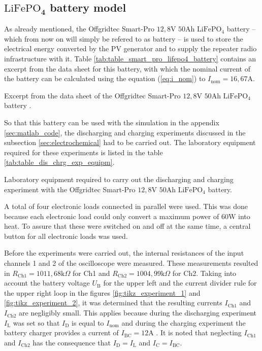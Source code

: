 \clearpage
\subsection{$\boldsymbol{\mathrm{LiFePO}_4}$ battery model} \label{sec_bat_res}
As already mentioned, the Offgridtec Smart-Pro $12,8\mathrm{V}$ $50\mathrm{Ah}$ $\mathrm{LiFePO_4}$ battery -- which from now on will simply be refered to as battery -- is used to store the electrical energy converted by the PV generator and to supply the repeater radio infrastructure with it. Table \ref{tab:table_smart_pro_lifepo4_battery} contains an excerpt from the data sheet for this battery, with which the nominal current of the battery can be calculated using the equation (\ref{eq:i_nom}) to $I_\mathrm{nom} = 16,67\mathrm{A}$. 
\begin{table}[h!]
	\centering
	
	\caption{Excerpt from the data sheet of the Offgridtec Smart-Pro $12,8\mathrm{V}$ $50\mathrm{Ah}$ $\mathrm{LiFePO_4}$ battery \cite{Offgridtec:2020}.}
	\label{tab:table_smart_pro_lifepo4_battery}
\end{table}

So that this battery can be used with the \MATLAB simulation in the appendix \ref{sec:matlab_code}, the discharging and charging experiments discussed in the subsection \ref{sec:electrochemical} had to be carried out. The laboratory equipment required for these experiments is listed in the table \ref{tab:table_dis_chrg_exp_equipm}.
\begin{table}[h!]
	\centering
	
	\caption{Laboratory equipment required to carry out the discharging and charging experiment with the Offgridtec Smart-Pro $12,8\mathrm{V}$ $50\mathrm{Ah}$ $\mathrm{LiFePO_4}$ battery.}
	\label{tab:table_dis_chrg_exp_equipm}
\end{table}
A total of four electronic loads connected in parallel were used. This was done because each electronic load could only convert a maximum power of $60\mathrm{W}$ into heat. To assure that these were switched on and off at the same time, a central button for all electronic loads was used.

Before the experiments were carried out, the internal resistances of the input channels 1 and 2 of the oscilloscope were measured. These measurements resulted in $R_\mathrm{Ch1} = 1011,68\mathrm{k}\Omega$ for Ch1 and $R_\mathrm{Ch2} = 1004,99\mathrm{k}\Omega$ for Ch2. Taking into account the battery voltage $U_\mathrm{B}$ for the upper left and the current divider rule for the upper right loop in the figures \ref{fig:tikz_experiment_1} and \ref{fig:tikz_experiment_2}, it was determined that the resulting currents $I_\mathrm{Ch1}$ and $I_\mathrm{Ch2}$ are negligibly small. This applies because during the discharging experiment $I_\mathrm{L}$ was set so that $I_\mathrm{D}$ is equal to $I_\mathrm{nom}$ and during the charging experiment the battery charger provides a current of $I_\mathrm{BC} = 12\mathrm{A}$ \cite{MeanWell}. It is noted that neglecting $I_\mathrm{Ch1}$ and $I_\mathrm{Ch2}$ has the consequence that $I_\mathrm{D} = I_\mathrm{L}$ and $I_\mathrm{C} = I_\mathrm{BC}$.

